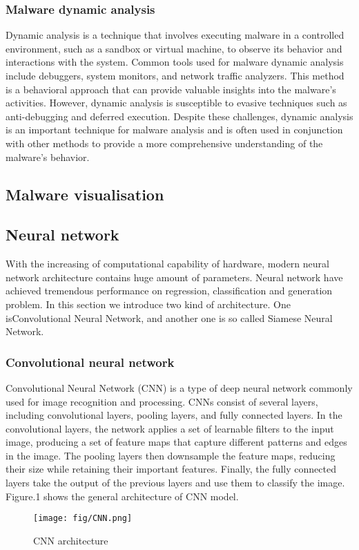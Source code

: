 \documentclass{article}
\begin{document}
\subsubsection{Malware dynamic analysis}
Dynamic analysis is a technique that involves executing malware in a controlled environment, such as a sandbox or virtual machine, to observe its behavior and interactions with the system. Common tools used for malware dynamic analysis include debuggers, system monitors, and network traffic analyzers. This method is a behavioral approach that can provide valuable insights into the malware's activities. However, dynamic analysis is susceptible to evasive techniques such as anti-debugging and deferred execution. Despite these challenges, dynamic analysis is an important technique for malware analysis and is often used in conjunction with other methods to provide a more comprehensive understanding of the malware's behavior.
\subsection{Malware visualisation}
\subsection{Neural network} 
With the increasing of computational capability of hardware, modern neural network architecture contains huge amount of parameters.
Neural network have achieved tremendous performance on regression, classification and generation problem.
In this section we introduce two kind of architecture. One isConvolutional Neural Network, and another one is so called Siamese Neural Network.
\subsubsection{Convolutional neural network}
Convolutional Neural Network (CNN) is a type of deep neural network commonly used for image recognition and processing. 
CNNs consist of several layers, including convolutional layers, pooling layers, and fully connected layers. In the convolutional layers, the network applies a set of learnable filters to the input image, 
producing a set of feature maps that capture different patterns and edges in the image. The pooling layers then downsample the feature maps, reducing their size while retaining their important features. Finally, 
the fully connected layers take the output of the previous layers and use them to classify the image. Figure.1 shows the general architecture of CNN model.
\begin{figure}
    \texttt{[image: fig/CNN.png]}    
    \caption{CNN architecture}
\end{figure}
\end{document}
